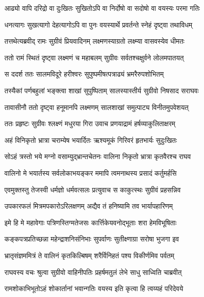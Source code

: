 \twolineshloka
{आढ्यो वापि दरिद्रो वा दुःखितः सुखितोऽपि वा}
{निर्दोषो वा सदोषो वा वयस्यः परमा गतिः} %

\twolineshloka
{धनत्यागः सुखत्यागो देहत्यागोऽपि वा पुनः}
{वयस्यार्थे प्रवर्तन्ते स्नेहं दृष्ट्वा तथाविधम्} %

\twolineshloka
{तत्तथेत्यब्रवीद् रामः सुग्रीवं प्रियवादिनम्}
{लक्ष्मणस्याग्रतो लक्ष्म्या वासवस्येव धीमतः} %

\twolineshloka
{ततो रामं स्थितं दृष्ट्वा लक्ष्मणं च महाबलम्}
{सुग्रीवः सर्वतश्चक्षुर्वने लोलमपातयत्} %

\twolineshloka
{स ददर्श ततः सालमविदूरे हरीश्वरः}
{सुपुष्पमीषत्पत्राढ्यं भ्रमरैरुपशोभितम्} %

\twolineshloka
{तस्यैकां पर्णबहुलां भङ्क्त्वा शाखां सुपुष्पिताम्}
{सालस्यास्तीर्य सुग्रीवो निषसाद सराघवः} %

\twolineshloka
{तावासीनौ ततो दृष्ट्वा हनूमानपि लक्ष्मणम्}
{सालशाखां समुत्पाट्य विनीतमुपवेशयत्} %

\twolineshloka
{ततः प्रहृष्टः सुग्रीवः श्लक्ष्णं मधुरया गिरा}
{उवाच प्रणयाद्रामं हर्षव्याकुलिताक्षरम्} %

\twolineshloka
{अहं विनिकृतो भ्रात्रा चराम्येष भयार्दितः}
{ऋश्यमूकं गिरिवरं हृतभार्यः सुदुःखितः} %

\twolineshloka
{सोऽहं त्रस्तो भये मग्नो वसाम्युद्भ्रान्तचेतनः}
{वालिना निकृतो भ्रात्रा कृतवैरश्च राघव} %

\twolineshloka
{वालिनो मे भयार्तस्य सर्वलोकाभयङ्कर}
{ममापि त्वमनाथस्य प्रसादं कर्तुमर्हसि} %

\twolineshloka
{एवमुक्तस्तु तेजस्वी धर्मज्ञो धर्मवत्सलः}
{प्रत्युवाच स काकुत्स्थः सुग्रीवं प्रहसन्निव} %

\twolineshloka
{उपकारफलं मित्रमपकारोऽरिलक्षणम्}
{अद्यैव तं हनिष्यामि तव भार्यापहारिणम्} %

\twolineshloka
{इमे हि मे महावेगाः पत्रिणस्तिग्मतेजसः}
{कार्त्तिकेयवनोद्भूताः शरा हेमविभूषिताः} %

\twolineshloka
{कङ्कपत्रप्रतिच्छन्ना महेन्द्राशनिसंनिभाः}
{सुपर्वाणः सुतीक्ष्णाग्रा सरोषा भुजगा इव} %

\twolineshloka
{भ्रातृसंज्ञममित्रं ते वालिनं कृतकिल्बिषम्}
{शरैर्विनिहतं पश्य विकीर्णमिव पर्वतम्} %

\twolineshloka
{राघवस्य वचः श्रुत्वा सुग्रीवो वाहिनीपतिः}
{प्रहर्षमतुलं लेभे साधु साध्विति चाब्रवीत्} %

\twolineshloka
{रामशोकाभिभूतोऽहं शोकार्तानां भवान्गतिः}
{वयस्य इति कृत्वा हि त्वय्यहं परिदेवये} %


